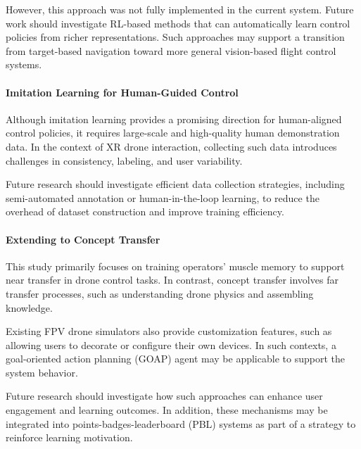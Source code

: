 However, this approach was not fully implemented in the current system. Future work should investigate RL-based methods that can automatically learn control policies from richer representations. Such approaches may support a transition from target-based navigation toward more general vision-based flight control systems.

\paragraph{Imitation Learning for Human-Guided Control}

Although imitation learning provides a promising direction for human-aligned control policies, it requires large-scale and high-quality human demonstration data. In the context of XR drone interaction, collecting such data introduces challenges in consistency, labeling, and user variability.

Future research should investigate efficient data collection strategies, including semi-automated annotation or human-in-the-loop learning, to reduce the overhead of dataset construction and improve training efficiency.

\paragraph{Extending to Concept Transfer}

This study primarily focuses on training operators' muscle memory to support near transfer in drone control tasks. In contrast, concept transfer involves far transfer processes, such as understanding drone physics and assembling knowledge.

Existing FPV drone simulators also provide customization features, such as allowing users to decorate or configure their own devices. In such contexts, a goal-oriented action planning (GOAP) agent may be applicable to support the system behavior.

Future research should investigate how such approaches can enhance user engagement and learning outcomes. In addition, these mechanisms may be integrated into points-badges-leaderboard (PBL) systems as part of a strategy to reinforce learning motivation.
